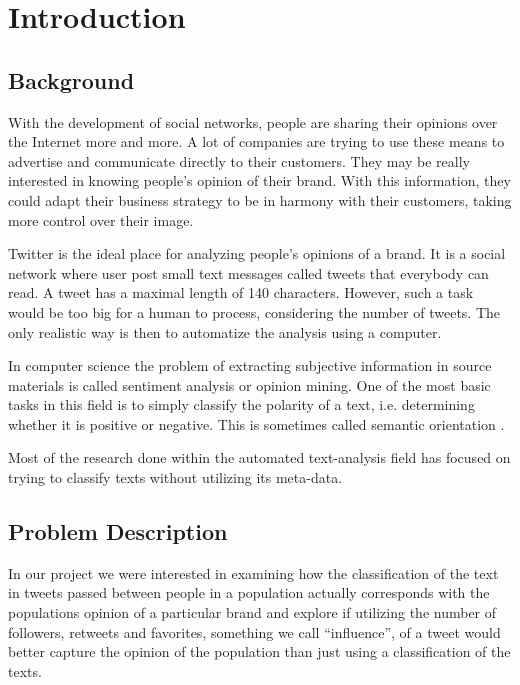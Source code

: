 \documentclass[a4paper,12pt]{report}
\begin{document}
\tableofcontents

\clearpage
\chapter{Introduction}

\section{Background}
With the development of social networks, people are sharing their opinions over the Internet more and more.
A lot of companies are trying to use these means to advertise and communicate directly to their customers.
They may be really interested in knowing people's opinion of their brand.
With this information, they could adapt their business strategy to be in harmony with their customers, taking more control over their image.

Twitter \cite{TwitterAbout} is the ideal place for analyzing people's opinions of a brand. 
It is a social network where user post small text messages called tweets that everybody can read. 
A tweet has a maximal length of 140 characters. However, such a task would be too big for a human to process, considering the number of tweets.
The only realistic way is then to automatize the analysis using a computer.

In computer science the problem of extracting subjective information in source materials is called sentiment analysis or opinion mining. 
One of the most basic tasks in this field is to simply classify the polarity of a text, i.e. determining whether it is positive or negative. 
This is sometimes called semantic orientation \cite{SenWiki}. 

Most of the research done within the automated text-analysis field has focused on trying to classify texts without utilizing its meta-data.

\section{Problem Description}

In our project we were interested in examining how the classification of the text in tweets passed between people in a population actually corresponds with the populations opinion of a particular brand and explore if utilizing the number of followers, retweets and favorites, something we call ``influence'', of a tweet would better capture the opinion of the population than just using a classification of the texts. 
\end{document}
